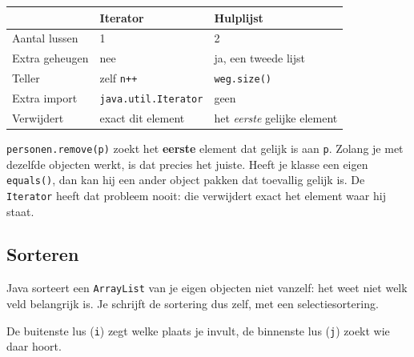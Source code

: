 \documentclass[a4paper,11pt]{article}
\begin{document}
\begin{center}
    \begin{tabular}{@{}lll@{}}
        \toprule
                       & \textbf{Iterator}           & \textbf{Hulplijst}                \\
        \midrule
        Aantal lussen  & 1                           & 2                                 \\
        Extra geheugen & nee                         & ja, een tweede lijst              \\
        Teller         & zelf \texttt{n++}           & \texttt{weg.size()}               \\
        Extra import   & \texttt{java.util.Iterator} & geen                              \\
        Verwijdert     & exact dit element           & het \emph{eerste} gelijke element \\
        \bottomrule
    \end{tabular}
\end{center}

\begin{warningbox}
    \texttt{personen.remove(p)} zoekt het \textbf{eerste} element dat gelijk is aan
    \texttt{p}. Zolang je met dezelfde objecten werkt, is dat precies het juiste.
    Heeft je klasse een eigen \texttt{equals()}, dan kan hij een ander object pakken
    dat toevallig gelijk is. De \texttt{Iterator} heeft dat probleem nooit: die
    verwijdert exact het element waar hij staat.
\end{warningbox}


\subsection{Sorteren}

Java sorteert een \texttt{ArrayList} van je eigen objecten niet vanzelf: het weet
niet welk veld belangrijk is. Je schrijft de sortering dus zelf, met een
selectiesortering.

\medskip
De buitenste lus (\texttt{i}) zegt welke plaats je invult, de binnenste lus
(\texttt{j}) zoekt wie daar hoort.
\end{document}
